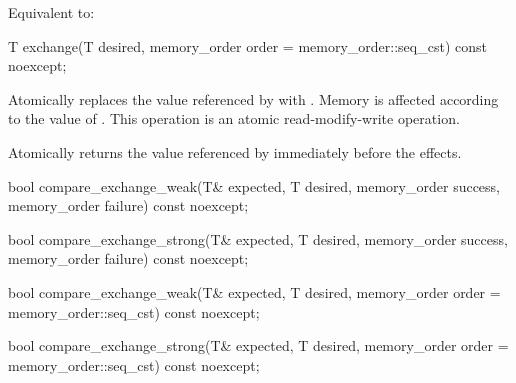 \begin{itemdescr}
\pnum
\effects
Equivalent to: 
\end{itemdescr}

%
%
%
%
\begin{itemdecl}
T exchange(T desired, memory_order order = memory_order::seq_cst) const noexcept;
\end{itemdecl}

\begin{itemdescr}
\pnum
\effects
Atomically replaces the value referenced by 
with .
Memory is affected according to the value of .
This operation is an atomic read-modify-write operation.

\pnum
\returns
Atomically returns the value referenced by 
immediately before the effects.
\end{itemdescr}

%
%
%
%
%
%
%
%
\begin{itemdecl}
bool compare_exchange_weak(T& expected, T desired,
                           memory_order success, memory_order failure) const noexcept;

bool compare_exchange_strong(T& expected, T desired,
                             memory_order success, memory_order failure) const noexcept;

bool compare_exchange_weak(T& expected, T desired,
                           memory_order order = memory_order::seq_cst) const noexcept;

bool compare_exchange_strong(T& expected, T desired,
                             memory_order order = memory_order::seq_cst) const noexcept;
\end{itemdecl}


